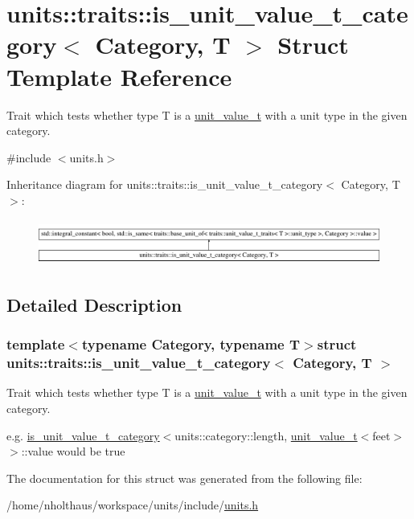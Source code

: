 \hypertarget{structunits_1_1traits_1_1is__unit__value__t__category}{}\section{units\+:\+:traits\+:\+:is\+\_\+unit\+\_\+value\+\_\+t\+\_\+category$<$ Category, T $>$ Struct Template Reference}
\label{structunits_1_1traits_1_1is__unit__value__t__category}


Trait which tests whether type T is a \hyperlink{structunits_1_1unit__value__t}{unit\+\_\+value\+\_\+t} with a unit type in the given category.  




{\ttfamily \#include $<$units.\+h$>$}

Inheritance diagram for units\+:\+:traits\+:\+:is\+\_\+unit\+\_\+value\+\_\+t\+\_\+category$<$ Category, T $>$\+:\begin{figure}[H]
\begin{center}
\leavevmode
\includegraphics[height=1.521739cm]{structunits_1_1traits_1_1is__unit__value__t__category}
\end{center}
\end{figure}


\subsection{Detailed Description}
\subsubsection*{template$<$typename Category, typename T$>$struct units\+::traits\+::is\+\_\+unit\+\_\+value\+\_\+t\+\_\+category$<$ Category, T $>$}

Trait which tests whether type T is a \hyperlink{structunits_1_1unit__value__t}{unit\+\_\+value\+\_\+t} with a unit type in the given category. 

e.\+g. {\ttfamily \hyperlink{structunits_1_1traits_1_1is__unit__value__t__category}{is\+\_\+unit\+\_\+value\+\_\+t\+\_\+category}$<$units\+::category\+::length, \hyperlink{structunits_1_1unit__value__t}{unit\+\_\+value\+\_\+t}$<$feet$>$$>$\+::value} would be true 

The documentation for this struct was generated from the following file\+:\begin{DoxyCompactItemize}
\item 
/home/nholthaus/workspace/units/include/\hyperlink{units_8h}{units.\+h}\end{DoxyCompactItemize}
